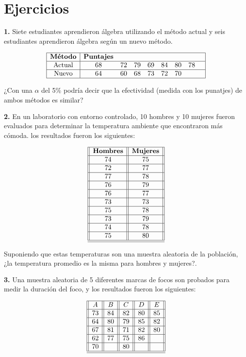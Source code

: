 \documentclass[
  a4paper,
  oneside,
  openany]{book}
\begin{document}
\hypertarget{ejercicios-1}{%
\chapter{Ejercicios}\label{ejercicios-1}}

\textbf{1.} Siete estudiantes aprendieron álgebra utilizando el método actual y seis estudiantes aprendieron álgebra según un nuevo método.

\[
\begin{array}{|c| c c c c c c c c|} 
\hline 
\textbf{Método} &\textbf{Puntajes} &&&&& & & \\ 
 \hline
\mbox{Actual} & 68 & 72 & 79 & 69 & 84 & 80 & 78 &\\ 
 \hline
\mbox{Nuevo} & 64 & 60 & 68 & 73 & 72 & 70& & \\ 
\hline
\end{array}
\]

¿Con una \(\alpha\) del 5\% podría decir que la efectividad (medida con los punatjes) de ambos métodos es similar?

\textbf{2.} En un laboratorio con entorno controlado, 10 hombres y 10 mujeres fueron evaluados para determinar la temperatura ambiente que encontraron más cómoda. los resultados fueron los siguientes:

\[
\begin{array}{||c| |c||} 
\hline 
\textbf{Hombres} & \textbf{Mujeres} \\  
 \hline
74&75\\
 \hline
72&77\\
 \hline
77&78\\
 \hline
76&79\\
 \hline
76&77\\
 \hline
73&73\\
 \hline
75&78\\
 \hline
73&79\\
 \hline
74&78\\
 \hline
75&80\\
  \hline
\hline
\end{array}
\]

Suponiendo que estas temperaturas son una muestra aleatoria de la población, ¿la temperatura promedio es la misma para hombres y mujeres?.

\textbf{3.} Una muestra aleatoria de 5 diferentes marcas de focos son probados para medir la duración del foco, y los resultados fueron los siguientes:

\[
\begin{array}{||c| |c| |c| |c||c||} 
\hline 
A & B&C&D&E \\ 
 \hline
73&84&82&80&85\\
 \hline
64&80&79&85&82\\
 \hline
67&81&71&82&80\\
 \hline
62&77&75&86&\\
 \hline
70&&80&&\\
\hline
\hline
\end{array}
\]
\end{document}
